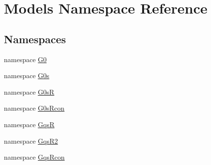 \hypertarget{namespace_models}{\section{Models Namespace Reference}
\label{namespace_models}
}
\subsection*{Namespaces}
\begin{DoxyCompactItemize}
\item 
namespace \hyperlink{namespace_models_1_1_g0}{G0}
\item 
namespace \hyperlink{namespace_models_1_1_g0s}{G0s}
\item 
namespace \hyperlink{namespace_models_1_1_g0s_r}{G0s\-R}
\item 
namespace \hyperlink{namespace_models_1_1_g0s_rcon}{G0s\-Rcon}
\item 
namespace \hyperlink{namespace_models_1_1_gqs_r}{Gqs\-R}
\item 
namespace \hyperlink{namespace_models_1_1_gqs_r2}{Gqs\-R2}
\item 
namespace \hyperlink{namespace_models_1_1_gqs_rcon}{Gqs\-Rcon}
\end{DoxyCompactItemize}
